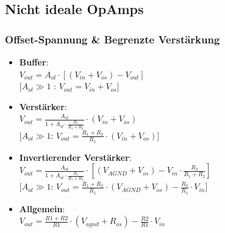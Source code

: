\documentclass[margin=normal]{tex/hsrzf}
\begin{document}
\subsection{Nicht ideale OpAmps}
\begin{minipage}{0.5\textwidth}

  \small
  \subsubsection*{Offset-Spannung \& Begrenzte Verstärkung}
  \begin{itemize}[leftmargin=*]
    \item \textbf{Buffer}: \\
          $V_{out} = A_{ol} \cdot [(V_{in}+V_{os}) - V_{out}]$
          \\$[A_{ol}\gg 1$ : $V_{out} = V_{in} + V_{os}]$

    \item \textbf{Verstärker}: \\
          $V_{out} = \frac{A_{ol}}{1+A_{ol}\cdot\frac{R_1}{R_1+R_2}}\cdot(V_{in}+V_{os}) $
          \\$[A_{ol}\gg 1$: $V_{out} = \frac{R_1+R_2}{R_1}\cdot(V_{in}+V_{os})]$

    \item \textbf{Invertierender Verstärker}: \\
          $V_{out} = \frac{A_{ol}}{1+A_{ol}\cdot\frac{R_1}{R_1+R_2}}\cdot[(V_{AGND} + V_{os})-V_{in}\cdot\frac{R_2}{R_1+R_2}]$
          \\ $[A_{ol}\gg 1$: $V_{out} = \frac{R_1 + R_2}{R_1}\cdot(V_{AGND}+V_{os})-\frac{R_2}{R_1}\cdot V_{in}]$

    \item \textbf{Allgemein}: \\
          $V_{out} = \frac{R1 + R2}{R1}\cdot(V_{agnd}+R_{os})-\frac{R2}{R1}\cdot V_{in}$

  \end{itemize}
\end{minipage}%
\end{document}
